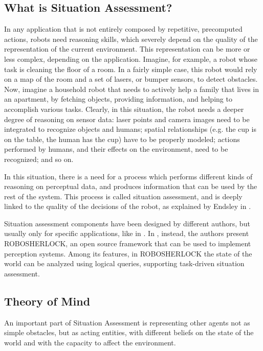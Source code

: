 \subsection{What is Situation Assessment?}
In any application that is not entirely composed by repetitive, precomputed actions, robots need reasoning skills, which severely depend on the quality of the representation of the current environment. This representation can be more or less complex, depending on the application. Imagine, for example, a robot whose task is cleaning the floor of a room. In a fairly simple case, this robot would rely on a map of the room and a set of lasers, or bumper sensors, to detect obstacles. Now, imagine a household robot that needs to actively help a family that lives in an apartment, by fetching objects, providing information, and helping to accomplish various tasks. Clearly, in this situation, the robot needs a deeper degree of reasoning on sensor data: laser points and camera images need to be integrated to recognize objects and humans; spatial relationships  (e.g. the cup is on the table, the human has the cup) have to be properly modeled; actions performed by humans, and their effects on the environment, need to be recognized; and so on. 

In this situation, there is a need for a process which performs different kinds of reasoning on perceptual data, and produces information that can be used by the rest of the system. This process is called situation assessment, and is deeply linked to the quality of the decisions of the robot, as explained by Endsley in \cite{endsley1995toward}. 


Situation assessment components have been designed by different authors, but usually only for specific applications, like in \cite{Chella2010,Kluge01situationassessment}. In \cite{beetz2015robosherlock}, instead, the authors present ROBOSHERLOCK, an open source framework that can be used to implement perception systems. Among its features, in ROBOSHERLOCK the state of the world can be analyzed using  logical queries,  supporting task-driven situation assessment. 

\subsection{Theory of Mind}
An important part of Situation Assessment is representing other agents not as simple obstacles, but as acting entities, with different beliefs on the state of the world and with the capacity to affect the environment. 

